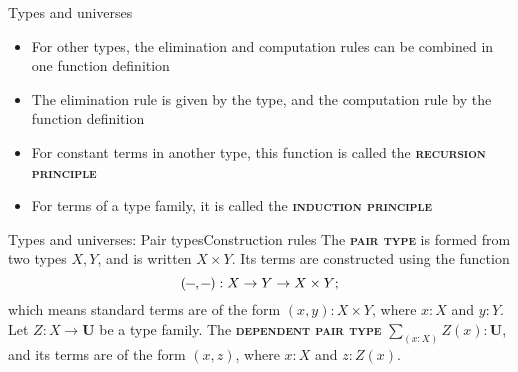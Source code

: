 \documentclass{beamer}
\newcommand{\defn}[1]{{\scshape\bfseries\color{MPBemph}#1}}
\newcommand{\dash}{\rule[0.5ex]{1.5ex}{0.4pt}}
\newcommand{\U}{\textbf{U}}
\newcommand{\tsigma}[1]{\sum_{(#1)}}
\newcommand{\1}{\textbf{1}}
\newcommand{\0}{\mathbf{0}}
\newcommand{\2}{\textbf{2}}
\begin{document}
\begin{frame}{Types and universes}
\begin{itemize}[<+- >]
	\item For other types, the elimination and computation rules can be combined in one function definition
	\item The elimination rule is given by the type, and the computation rule by the function definition
	\item For constant terms in another type, this function is called the \defn{recursion principle}
	\item For terms of a type family, it is called the \defn{induction principle}
\end{itemize} \end{frame}
\begin{frame}{Types and universes: Pair types}{Construction rules}
The \defn{pair type} is formed from two types \( X, Y \), and is written \( X \times Y \). Its terms are constructed using the function
\[ (\dash, \dash) : X \to Y \to X \times Y; \]
which means standard terms are of the form \( (x, y) : X \times Y \), where \( x : X \) and \( y : Y \). \\[6pt]
\pause
Let \( Z : X \to \U \) be a type family. The \defn{dependent pair type} \( \tsigma{x : X} Z(x) : \U \), and its terms are of the form \( (x, z) \), where \( x : X \) and \( z : Z(x) \).
\end{frame}
\end{document}
